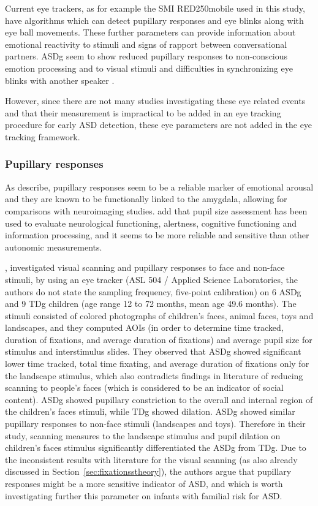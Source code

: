 Current eye trackers, as for example the SMI RED250mobile used in this study, have algorithms which can detect pupillary responses and eye blinks along with eye ball movements. These further parameters can provide information about emotional reactivity to stimuli and signs of rapport between conversational partners. ASDg seem to show reduced pupillary responses to non-conscious emotion processing and to visual stimuli \citep{nuske2014pupil,martineau2011pupil} and difficulties in synchronizing eye blinks with another speaker \citep{nakan02011blinks}.

However, since there are not many studies investigating these eye related events and that their measurement is impractical to be added in an eye tracking procedure for early ASD detection, these eye parameters are not added in the eye tracking framework.

\subsubsection{Pupillary responses}
\label{sec:pupillaryresponses}

As \cite{nuske2014pupil} describe, pupillary responses seem to be a reliable marker of emotional arousal and they are known to be functionally linked to the amygdala, allowing for comparisons with neuroimaging studies. \cite{martineau2011pupil} add that pupil size assessment has been used to evaluate neurological functioning, alertness, cognitive functioning and information processing, and it seems to be more reliable and sensitive than other autonomic measurements.

\cite{anderson2006visualscanning}, investigated visual scanning and pupillary responses to face and non-face stimuli, by using an eye tracker (ASL 504 / Applied Science Laboratories, the authors do not state the sampling frequency, five-point calibration) on 6 ASDg and 9 TDg children (age range 12 to 72 months, mean age 49.6 months). The stimuli consisted of colored photographs of children’s faces, animal faces, toys and landscapes, and they computed AOIs (in order to determine time tracked, duration of fixations, and average duration of fixations) and average pupil size for stimulus and interstimulus slides. They observed that ASDg showed significant lower time tracked, total time fixating, and average duration of fixations only for the landscape stimulus, which also contradicts findings in literature of reducing scanning to people’s faces (which is considered to be an indicator of social content). ASDg showed pupillary constriction to the overall and internal region of the children’s faces stimuli, while TDg showed dilation. ASDg showed similar pupillary responses to non-face stimuli (landscapes and toys). Therefore in their study, scanning measures to the landscape stimulus and pupil dilation on children’s faces stimulus significantly differentiated the ASDg from TDg. Due to the inconsistent results with literature for the visual scanning (as also already discussed in Section~\ref{sec:fixationsstheory}), the authors argue that pupillary responses might be a more sensitive indicator of ASD, and which is worth investigating further this parameter on infants with familial risk for ASD.

